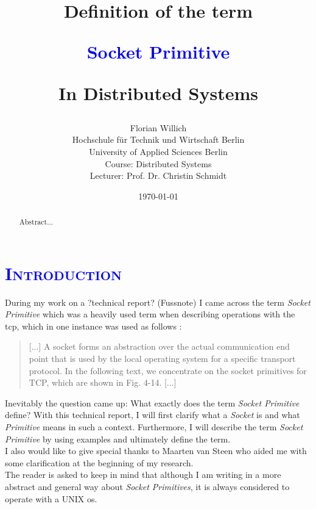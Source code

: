 \documentclass[xcolor=dvipsnames]{article}
\title{\scshape{
\begin{small}
Definition of the term\\
\end{small} 
\textbf{\textcolor{blue}{Socket Primitive}}\\
\begin{small}
In Distributed Systems
\end{small}
}}
\author{Florian Willich \\ Hochschule f\"ur Technik und Wirtschaft Berlin \\ University of Applied Sciences Berlin \\ Course: Distributed Systems \\ Lecturer: Prof. Dr. Christin Schmidt}
\date{\today}
\begin{document}

\begin{titlepage}

\maketitle

\begin{abstract}
Abstract...
\end{abstract}

\end{titlepage}

\newpage

\tableofcontents

\newpage



\section{\scshape{\textcolor{blue}{Introduction}}} \label{introduction}

During my work on a ?technical report? (Fussnote) I came across the term \textit{Socket Primitive} which was a heavily used term when describing operations with the \gls{tcp}, which in one instance was used as follows \cite[p. 141, ch. 4.3.1]{tanenbaum}:

\begin{quote}
[...] A socket forms an abstraction over the actual communication end
point that is used by the local operating system for a specific
transport protocol. In the following text, we concentrate on the socket
primitives for TCP, which are shown in Fig. 4-14. [...] 
\end{quote}

\noindent Inevitably the question came up: What exactly does the term \textit{Socket Primitive} define?  With this technical report, I will first clarify what a \textit{Socket} is and what \textit{Primitive} means in such a context. Furthermore, I will describe the term \textit{Socket Primitive} by using examples and ultimately define the term.\\

\noindent I also would like to give special thanks to Maarten van Steen who aided me with some clarification at the beginning of my research.\\

\noindent The reader is asked to keep in mind that although I am writing in a more abstract and general way about \textit{Socket Primitives}, it is always considered to operate with a UNIX \gls{os}.
\end{document}
